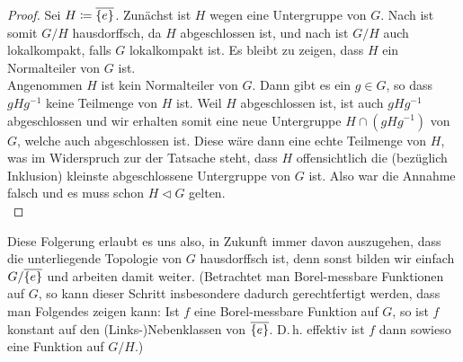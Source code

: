 \begin{proof}
    Sei $H\coloneqq \overline{\{e\}}$. 
    Zunächst ist $H$ wegen  eine Untergruppe von $G$.
    Nach  ist somit $G/H$ hausdorffsch, da $H$
    abgeschlossen ist, und nach  ist $G/H$ auch
    lokalkompakt, falls $G$ lokalkompakt ist. Es bleibt zu zeigen, dass $H$ ein
    Normalteiler von $G$ ist.
    \\
    Angenommen $H$ ist kein Normalteiler von $G$. Dann gibt es ein $g\in G$,
    so dass $gHg^{-1}$ keine Teilmenge von $H$ ist. Weil $H$ abgeschlossen ist,
    ist auch $gHg^{-1}$ abgeschlossen und wir erhalten somit eine neue
    Untergruppe $H \cap (gHg^{-1})$ von $G$, welche auch abgeschlossen ist.
    Diese wäre dann eine echte Teilmenge von $H$, was im Widerspruch zur
    der Tatsache steht, dass $H$ offensichtlich die (bezüglich Inklusion)
    kleinste abgeschlossene Untergruppe von $G$ ist. Also war die Annahme falsch
    und es muss schon $H\triangleleft G$ gelten.
    \\
\end{proof}

Diese Folgerung erlaubt es uns also, in Zukunft immer davon auszugehen, dass die
unterliegende Topologie von $G$ hausdorffsch ist, denn sonst bilden wir einfach
$G/\overline{\{e\}}$ und arbeiten damit weiter. (Betrachtet man Borel-messbare
Funktionen auf $G$, so kann dieser Schritt insbesondere dadurch gerechtfertigt
werden, dass man Folgendes zeigen kann: Ist $f$ eine Borel-messbare Funktion auf
$G$, so ist $f$ konstant auf den (Links-)Nebenklassen von $\overline{\{e\}}$.
D.\,h. effektiv ist $f$ dann sowieso eine Funktion auf $G/H$.)








































